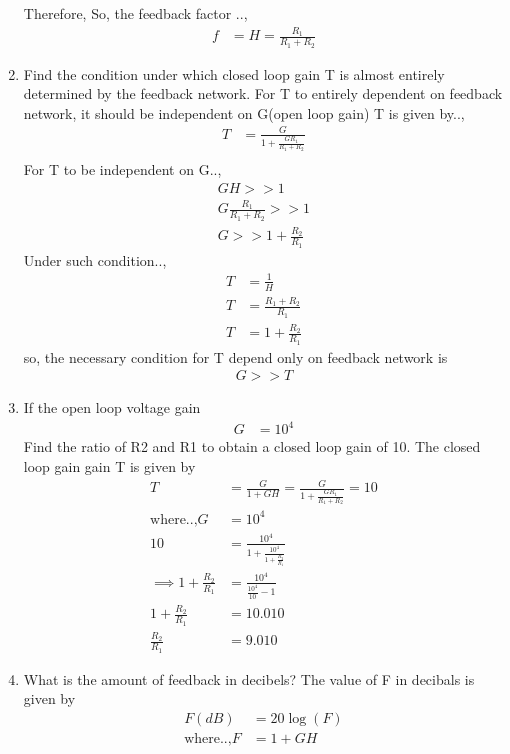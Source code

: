 \begin{enumerate}[label=\thesubsection.\arabic*.,ref=\thesubsection.\theenumi]
Therefore,
So, the feedback factor ..,
\begin{align}
     f &= H = \frac{R_1}{R_1+R_2}
\end{align}
\item Find the condition under which closed loop gain T is almost entirely determined by the feedback network.
\solution For T to entirely dependent on feedback network, it should be independent on G(open loop gain)
T is given by..,
\begin{align}
    T &= \frac{G}{1+\frac{GR_1}{R_1+R_2}} \\
\end{align}
For T to be independent on G..,
\begin{align}
 GH >> 1 \\
 G\frac{R_1}{R_1+R_2} >> 1 \\
 G >> 1 + \frac{R_2}{R_1} 
\end{align}
Under such condition..,
\begin{align}
    T &= \frac{1}{H} \\
    T &= \frac{R_1+R_2}{R_1}\\
    T &= 1+\frac{R_2}{R_1}
\end{align}
so, the necessary condition for T depend only on feedback network is
\begin{align}
    G >> T
\end{align}
\item If the open loop voltage gain
\begin{align} 
G & = 10^4
\end{align}
Find the ratio of R2 and R1 to obtain a closed loop gain of 10.
\solution The closed loop gain gain T is given by
\begin{align}
    T &= \frac{G}{1+GH}
        = \frac{G}{1+\frac{GR_1}{R_1+R_2}} = 10\\
    \text{where..,} G &= 10^4 \\
    10 &= \frac{10^4}{1+\frac{10^4}{1+\frac{R_2}{R_1}}}\\
\implies 1+\frac{R_2}{R_1} &= \frac{10^4}{\frac{10^4}{10}-1}
\\
1+\frac{R_2}{R_1} &= 10.010
\\
\frac{R_2}{R_1} &= 9.010
\end{align}
\item What is the amount of feedback in decibels?
\solution The value of F in decibals is given by 
\begin{align}
    F(dB) &= 20\log(F)\\
\text{where..,} F &= 1+GH \\

\end{align}
\end{enumerate}
